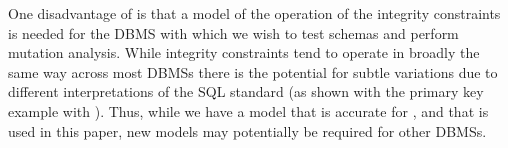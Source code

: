 One disadvantage of \VMA is that a model of the operation of the integrity constraints is needed for the DBMS with which we wish to test schemas and perform mutation analysis. While integrity constraints tend to operate in broadly the same way across most DBMSs there is the potential for subtle variations due to different interpretations of the SQL standard (as shown with the primary key example with \SQLite). Thus, while we have a model that is accurate for \HyperSQL, \Postgres and \SQLite that is used in this paper, new models may potentially be required for other DBMSs. 

